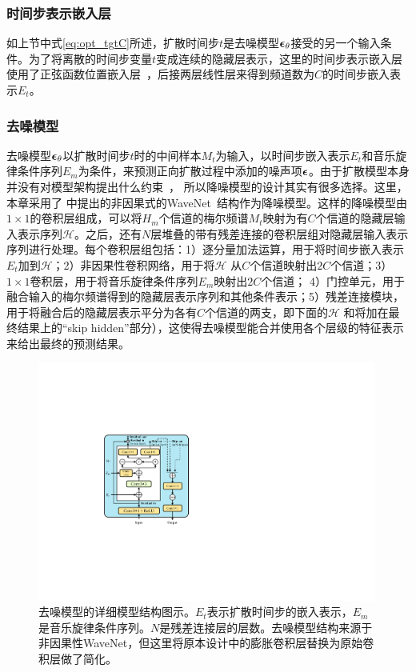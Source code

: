 \subsubsection{时间步表示嵌入层}
如上节中式\eqref{eq:opt_tgtC}所述，扩散时间步$t$是去噪模型${\boldsymbol{\epsilon}}_\theta$接受的另一个输入条件。为了将离散的时间步变量$t$变成连续的隐藏层表示，这里的时间步表示嵌入层使用了正弦函数位置嵌入层~\citep{vaswani2017attention}，后接两层线性层来得到频道数为$C$的时间步嵌入表示$E_t$。
\subsubsection{去噪模型}
去噪模型${\boldsymbol{\epsilon}}_\theta$以扩散时间步$t$时的中间样本$M_t$为输入，以时间步嵌入表示$E_t$和音乐旋律条件序列$E_m$为条件，来预测正向扩散过程中添加的噪声项${\boldsymbol{\epsilon}}$。由于扩散模型本身并没有对模型架构提出什么约束~\citep{sohl2015deep,kong2021diffwave}， 所以降噪模型的设计其实有很多选择。这里，
本章采用了\citet{rethage2018wavenet,kong2021diffwave}
中提出的非因果式的WaveNet~\citep{vanwavenet}结构作为降噪模型。这样的降噪模型由$1\times1$的卷积层组成，可以将$H_m$个信道的梅尔频谱$M_t$映射为有$C$个信道的隐藏层输入表示序列$\mathcal{H}$。之后，还有$N$层堆叠的带有残差连接的卷积层组对隐藏层输入表示序列进行处理。每个卷积层组包括：1）逐分量加法运算，用于将时间步嵌入表示$E_t$加到$\mathcal{H}$；2）非因果性卷积网络，用于将$\mathcal{H}$ 从$C$个信道映射出$2C$个信道；3）$1\times1$卷积层，用于将音乐旋律条件序列$E_m$映射出$2C$个信道； 4）门控单元，用于融合输入的梅尔频谱得到的隐藏层表示序列和其他条件表示；5）残差连接模块，用于将融合后的隐藏层表示平分为各有$C$个信道的两支，即下面的$\mathcal{H}$
和将加在最终结果上的``skip hidden''部分），这使得去噪模型能合并使用各个层级的特征表示来给出最终的预测结果。
\begin{figure}[htbp]
	\centering
	\small
	\includegraphics[width=0.99\textwidth,]{figure/svs/denoiser.pdf}
	\caption{去噪模型的详细模型结构图示。$E_t$表示扩散时间步的嵌入表示，$E_m$是音乐旋律条件序列。$N$是残差连接层的层数。去噪模型结构来源于非因果性WaveNet，但这里将原本设计中的膨胀卷积层替换为原始卷积层做了简化。}
	\label{supfig:denoiser}
\end{figure}
